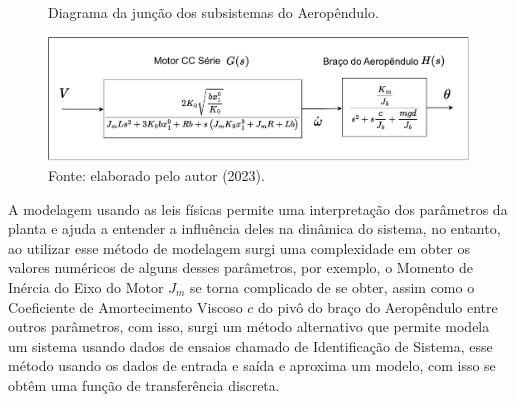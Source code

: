 \begin{figure}[!h]
	\centering
	\caption{Diagrama da junção dos subsistemas do  Aeropêndulo.}
            \includegraphics[width=1\textwidth, page=1]{Capitulos/2_aeropendulo/4_figuras/ft_subsistemas.pdf}
	\caption*{Fonte: elaborado pelo autor (2023).}
        \label{fig4:image_05}
\end{figure}



A modelagem usando as leis físicas permite uma interpretação dos parâmetros da planta e ajuda a entender a influência deles na dinâmica do sistema, no entanto, ao utilizar esse método de modelagem surgi uma complexidade em obter os valores numéricos de alguns desses parâmetros, por exemplo, o Momento de Inércia do Eixo do Motor $J_m$ se torna complicado de se obter, assim como o Coeficiente de Amortecimento Viscoso $c$ do pivô do braço do Aeropêndulo entre outros parâmetros, com isso, surgi um método alternativo que permite modela um sistema usando dados de ensaios chamado de Identificação de Sistema, esse método usando os dados de entrada e saída e aproxima um modelo, com isso se obtêm uma função de transferência discreta.